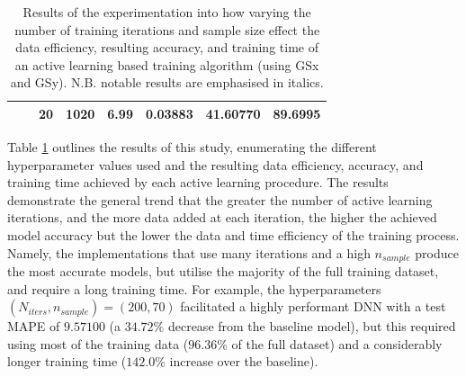 \documentclass[a4paper, 11pt]{report}
\begin{document}
\begin{table}[ht]
\begin{tabular}{|l|l|l|l|l|l|l|l|}
        \cline{3-8}
                                                                                &                                                                                 & 20                                                                     & 1020                                                                       & 6.99                                                                                             & 0.03883          & 41.60770          & 89.6995                                                                       \\
        \hline
        \end{tabular}
        \caption{\centering Results of the experimentation into how varying the number of training iterations and sample size effect the data efficiency, resulting accuracy, and training time of an active learning based training algorithm (using GSx and GSy). N.B. notable results are emphasised in italics.}
        \label{table: al-efficiency}
    \end{table}


    Table \ref{table: al-efficiency} outlines the results of this study, enumerating the different hyperparameter values used and the resulting data efficiency, accuracy, and training time achieved by each active learning procedure. The results demonstrate the general trend that the greater the number of active learning iterations, and the more data added at each iteration, the higher the achieved model accuracy but the lower the data and time efficiency of the training process. Namely, the implementations that use many iterations and a high $n_{sample}$ produce the most accurate models, but utilise the majority of the full training dataset, and require a long training time. For example, the hyperparameters $(N_{iters}, n_{sample}) = (200, 70)$ facilitated a highly performant DNN with a test MAPE of $9.57100$ (a $34.72\%$ decrease from the baseline model), but this required using most of the training data ($96.36\%$ of the full dataset) and a considerably longer training time ($142.0\%$ increase over the baseline).
\end{document}
